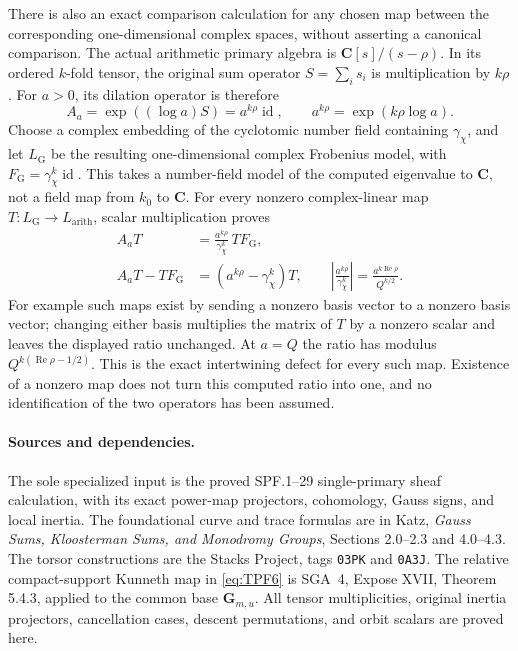 There is also an exact comparison calculation
for any chosen map between the corresponding
one-dimensional complex spaces, without
asserting a canonical comparison.
The actual arithmetic primary algebra is
\(\mathbf C[s]/(s-\rho)\). In its ordered
\(k\)-fold tensor, the original sum operator
\(S=\sum_i s_i\) is multiplication by \(k\rho\).
For \(a>0\), its dilation operator is therefore
\[
 A_a=\exp((\log a)S)=a^{k\rho}\operatorname{id},
 \qquad a^{k\rho}=\exp(k\rho\log a).
 \tag{TPF.54}\label{eq:TPF54}
\]
Choose a complex embedding of the cyclotomic
number field containing \(\gamma_\chi\),
and let \(L_{\mathrm{G}}\) be the resulting
one-dimensional complex Frobenius model,
with \(F_{\mathrm G}=\gamma_\chi^k\operatorname{id}\).
This takes a number-field model of the
computed eigenvalue to \(\mathbf C\), not
a field map from \(k_0\) to \(\mathbf C\).
For every nonzero complex-linear map
\(T:L_{\mathrm G}\to L_{\mathrm{arith}}\),
scalar multiplication proves
\[
 \begin{split}
 A_aT
    &=\frac{a^{k\rho}}{\gamma_\chi^k}\,TF_{\mathrm G},\\
 A_aT-TF_{\mathrm G}
    &=(a^{k\rho}-\gamma_\chi^k)T,\qquad
 \left|\frac{a^{k\rho}}{\gamma_\chi^k}\right|
       =\frac{a^{k\operatorname{Re}\rho}}{Q^{k/2}} .
 \end{split}
 \tag{TPF.55}\label{eq:TPF55}
\]
For example such maps exist by sending a
nonzero basis vector to a nonzero basis
vector; changing either basis multiplies
the matrix of \(T\) by a nonzero scalar
and leaves the displayed ratio unchanged.
At \(a=Q\) the ratio has modulus
\(Q^{k(\operatorname{Re}\rho-1/2)}\).
This is the exact intertwining defect for
every such map. Existence of a nonzero
map does not turn this computed ratio
into one, and no identification of the
two operators has been assumed.

\paragraph{Sources and dependencies.}
The sole specialized input is the proved SPF.1--29
single-primary sheaf calculation, with its exact
power-map projectors, cohomology, Gauss signs,
and local inertia. The foundational curve and
trace formulas are in Katz,
\emph{Gauss Sums, Kloosterman Sums, and Monodromy
Groups}, Sections 2.0--2.3 and 4.0--4.3.
The torsor constructions are the Stacks Project,
tags \texttt{03PK} and \texttt{0A3J}. The relative
compact-support Kunneth map in
\eqref{eq:TPF6} is SGA~4, Expose XVII,
Theorem 5.4.3, applied to the common base
\(\mathbf G_{m,u}\). All
tensor multiplicities, original inertia
projectors, cancellation cases, descent
permutations, and orbit scalars are proved here.

